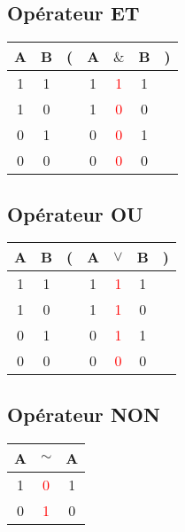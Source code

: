 \documentclass[12pt,a4paper]{article}
\begin{document}
	\subsection{Opérateur \textbf{ET}}
	
	\begin{center}
		\begin{tabular}{@{ }c@{ }@{ }c | c@{}@{ }c@{ }@{ }c@{ }@{ }c@{ }@{}c@{ }}
		A & B & ( & A & $\&$ & B & )\\
		\hline 
		1 & 1 &  & 1 & \textcolor{red}{1} & 1 & \\
		1 & 0 &  & 1 & \textcolor{red}{0} & 0 & \\
		0 & 1 &  & 0 & \textcolor{red}{0} & 1 & \\
		0 & 0 &  & 0 & \textcolor{red}{0} & 0 & \\
	\end{tabular}
	\end{center}

	\subsection{Opérateur \textbf{OU}}
	
	\begin{center}
		\begin{tabular}{@{ }c@{ }@{ }c | c@{}@{ }c@{ }@{ }c@{ }@{ }c@{ }@{}c@{ }}
		A & B & ( & A & $\lor$ & B & )\\
		\hline 
		1 & 1 &  & 1 & \textcolor{red}{1} & 1 & \\
		1 & 0 &  & 1 & \textcolor{red}{1} & 0 & \\
		0 & 1 &  & 0 & \textcolor{red}{1} & 1 & \\
		0 & 0 &  & 0 & \textcolor{red}{0} & 0 & \\
	\end{tabular}
	\end{center}

	\subsection{Opérateur \textbf{NON}}
	
	\begin{center}
		\begin{tabular}{@{ }c | c@{ }@{ }c}
		A & $\sim$ & A\\
		\hline 
		1 & \textcolor{red}{0} & 1\\
		0 & \textcolor{red}{1} & 0\\
	\end{tabular}
	\end{center}
\end{document}

